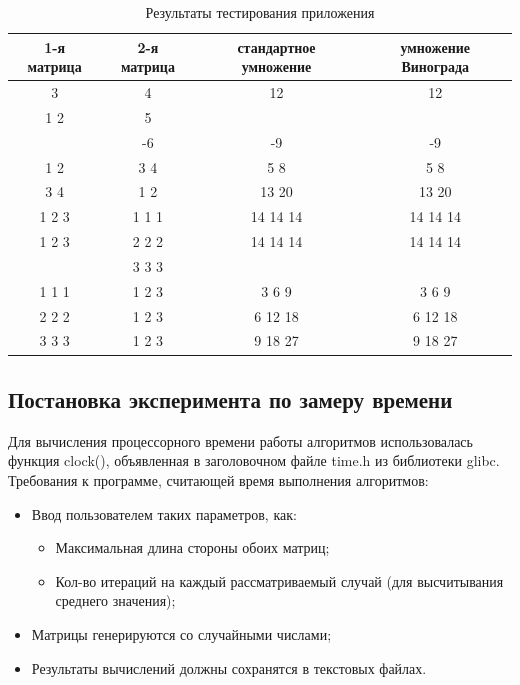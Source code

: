 \documentclass[a4paper,12pt]{article}
\begin{document}
\begin{table}[h]
\caption{\label{tablice:tests}Результаты тестирования приложения}
\begin{center}
\begin{tabular}{|c|c|c|c|}
\hline
1-я матрица & 2-я матрица & стандартное умножение & умножение Винограда \\
\hline
3 & 4 & 12 & 12 \\
\hline
1 2 & 5 & & \\
 & -6 & -9 & -9 \\
\hline
1 2 & 3 4 & 5 8 & 5 8 \\
3 4 & 1 2 & 13 20 & 13 20 \\
\hline
1 2 3 & 1 1 1 & 14 14 14 & 14 14 14 \\
1 2 3 & 2 2 2 & 14 14 14 & 14 14 14 \\
      & 3 3 3 & & \\
\hline
1 1 1 & 1 2 3 & 3 6 9 & 3 6 9 \\
2 2 2 & 1 2 3 & 6 12 18 & 6 12 18 \\
3 3 3 & 1 2 3 & 9 18 27 & 9 18 27 \\
\hline
\end{tabular}
\end{center}
\end{table}

\newpage
\subsection{Постановка эксперимента по замеру времени}
Для вычисления процессорного времени работы алгоритмов использовалась функция clock(), объявленная в заголовочном файле time.h из библиотеки glibc. \\
Требования к программе, считающей время выполнения алгоритмов:
\begin{itemize}
\item Ввод пользователем таких параметров, как:
\begin{itemize}
\item Максимальная длина стороны обоих матриц;
\item Кол-во итераций на каждый рассматриваемый случай (для высчитывания среднего значения);
\end{itemize}
\item Матрицы генерируются со случайными числами;
\item Результаты вычислений должны сохранятся в текстовых файлах.
\end{itemize}
\end{document}
